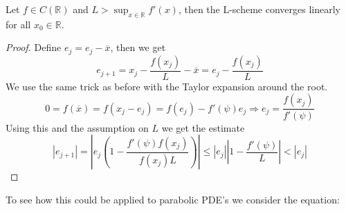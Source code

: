 \documentclass[../Main/main.tex]{subfiles}
\begin{document}
	\begin{theorem}
		Let $f\in C(\mathbb{R})$ and $L>\sup_{x\in\mathbb{R}}f'(x)$, then the L-scheme converges linearly for all $x_0\in \mathbb{R}$.
	\end{theorem}
	\begin{proof}
		Define $e_j = e_j-\overline{x}$, then we get
		\begin{equation}
			e_{j+1} = x_j-\frac{f(x_j)}{L}-\overline{x}=e_j-\frac{f(x_j)}{L}
		\end{equation}
		We use the same trick as before with the Taylor expansion around the root.
		\begin{equation}
			0 = f(\overline{x}) = f(x_j-e_j) = f(e_j)-f'(\psi)e_j\Rightarrow e_j = \frac{f(x_j)}{f'(\psi)}
		\end{equation}
		Using this and the assumption on $L$ we get the estimate
		\begin{equation}
			|e_{j+1}|=|e_j(1-\frac{f'(\psi)f(x_j)}{f(x_j)L})|\leq|e_j||1-\frac{f'(\psi)}{L}|<|e_j|
		\end{equation}
	\end{proof}
	To see how this could be applied to parabolic PDE's we consider the equation:
	
	
	
\end{document}
